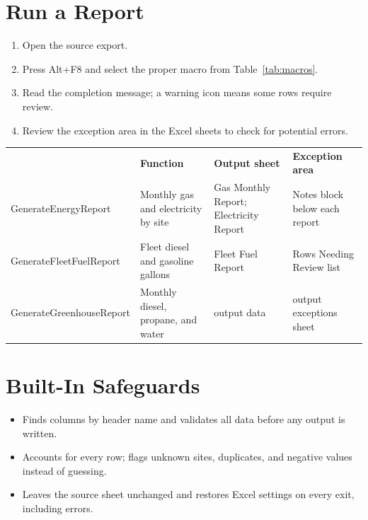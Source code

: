 \documentclass[11pt]{article}
\begin{document}
\section{Run a Report}
\begin{enumerate}
  \item Open the source export.
  \item Press Alt+F8 and select the proper macro from Table~\ref{tab:macros}.
  \item Read the completion message; a warning icon means some rows require review.
  \item Review the exception area in the Excel sheets to check for potential errors.
\end{enumerate}

\begin{center}
\small
{}\label{tab:macros}
\renewcommand{\arraystretch}{1.25}
\begin{tabularx}{\linewidth}{|>{\footnotesize\ttfamily\raggedright\arraybackslash}m{1.75in}|*{3}{L|}}
  \hline
   & \bfseries Function & \bfseries Output sheet & \bfseries Exception area \\
  \hhline{|=|=|=|=|}
  GenerateEnergyReport & Monthly gas and electricity by site & Gas Monthly Report; Electricity Report & Notes block below each report \\
  \hline
  GenerateFleetFuelReport & Fleet diesel and gasoline gallons & Fleet Fuel Report & Rows Needing Review list \\
  \hline
  GenerateGreenhouseReport & Monthly diesel, propane, and water & output data & output exceptions sheet \\
  \hline
\end{tabularx}
\end{center}

\section{Built-In Safeguards}
\begin{itemize}
  \item Finds columns by header name and validates all data before any output is written.
  \item Accounts for every row; flags unknown sites, duplicates, and negative values instead of guessing.
  \item Leaves the source sheet unchanged and restores Excel settings on every exit, including errors.
\end{itemize}
\end{document}
